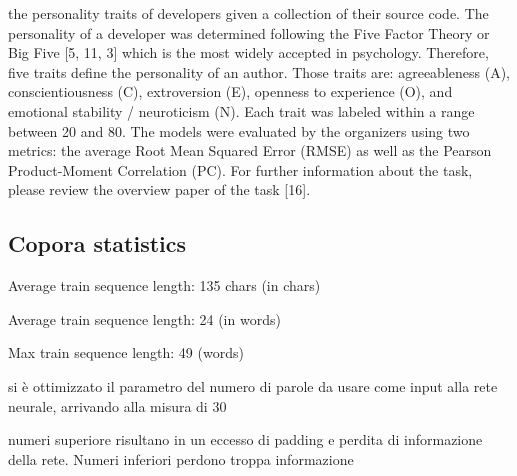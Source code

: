  the personality traits of developers given a collection of their source code. The personality of a developer was determined following the Five Factor Theory or Big Five [5, 11, 3] which is the most widely accepted in psychology. Therefore, five traits define the personality of an author. Those traits are: agreeableness (A), conscientiousness (C), extroversion (E), openness to experience (O), and emotional stability / neuroticism (N). Each trait was labeled within a range between 20 and 80. The models were evaluated by the organizers using two metrics: the average Root Mean Squared Error (RMSE) as well as the Pearson Product-Moment Correlation (PC). For further information about the task, please review the overview paper of the task [16].
 
\subsection{Copora statistics}

Average train sequence length: 135 chars (in chars)

Average train sequence length: 24 (in words)

Max train sequence length: 49 (words)

si è ottimizzato il parametro del numero di parole da usare come input alla rete neurale, arrivando alla misura di 30

numeri superiore risultano in un eccesso di padding e perdita di informazione della rete. Numeri inferiori perdono troppa informazione

